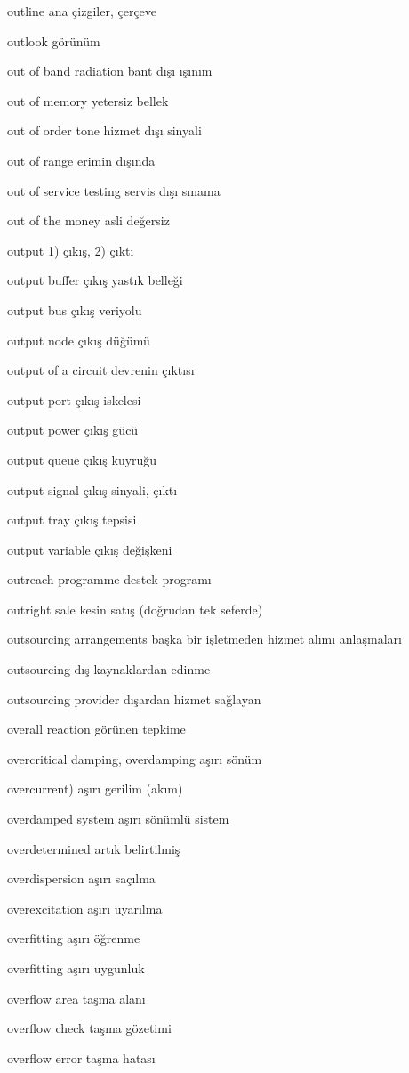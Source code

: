 \documentclass[12pt,fleqn]{article}\usepackage{../../common}
\begin{document}
outline ana çizgiler, çerçeve

outlook görünüm

out of band radiation bant dışı ışınım

out of memory yetersiz bellek

out of order tone hizmet dışı sinyali

out of range erimin dışında

out of service testing servis dışı sınama

out of the money asli değersiz

output 1) çıkış, 2) çıktı

output buffer çıkış yastık belleği

output bus çıkış veriyolu

output node çıkış düğümü

output of a circuit devrenin çıktısı

output port çıkış iskelesi

output power çıkış gücü

output queue çıkış kuyruğu

output signal çıkış sinyali, çıktı

output tray çıkış tepsisi

output variable çıkış değişkeni

outreach programme destek programı

outright sale kesin satış (doğrudan tek seferde)

outsourcing arrangements başka bir işletmeden hizmet alımı anlaşmaları

outsourcing dış kaynaklardan edinme

outsourcing provider dışardan hizmet sağlayan

overall reaction görünen tepkime

overcritical damping, overdamping aşırı sönüm

overcurrent) aşırı gerilim (akım)

overdamped system aşırı sönümlü sistem

overdetermined artık belirtilmiş

overdispersion aşırı saçılma

overexcitation aşırı uyarılma

overfitting aşırı öğrenme

overfitting aşırı uygunluk

overflow area taşma alanı

overflow check taşma gözetimi

overflow error taşma hatası
\end{document}
